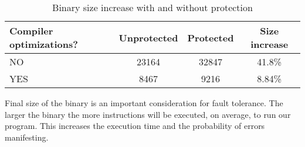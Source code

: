 \begin{table}[!h]
\centering
\begin{tabular}{|l|c|c|c|}
\hline
\textbf{Compiler optimizations?} & \textbf{Unprotected} & \textbf{Protected} & \textbf{Size increase} \\
\hline
NO  & 23164 & 32847 & 41.8\% \\
YES & 8467 & 9216 & 8.84\% \\
\hline
\end{tabular}
\caption{Binary size increase with and without protection}
\end{table}

Final size of the binary is an important consideration for fault tolerance. The larger the binary the more instructions will be executed, on average, to run our program. This increases the execution time and the probability of errors manifesting.